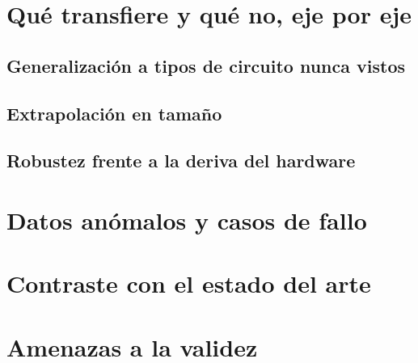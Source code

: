 \section{Qué transfiere y qué no, eje por eje}
\label{sec:transferencia}
\subsection{Generalización a tipos de circuito nunca vistos}
\subsection{Extrapolación en tamaño}
\subsection{Robustez frente a la deriva del hardware}

\section{Datos anómalos y casos de fallo}
\label{sec:anomalos}

\section{Contraste con el estado del arte}
\label{sec:contraste}

\section{Amenazas a la validez}
\label{sec:validez}

